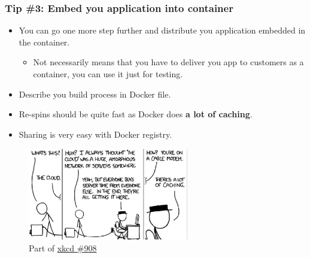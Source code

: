 \documentclass[10pt,utf8]{beamer}
\begin{document}
\begin{frame}
	\frametitle{Tip \#3: Embed you application into container}
	\begin{itemize}
		\item You can go one more step further and distribute you application embedded in the container.
		\begin{itemize}
			\item Not necessarily means that you have to deliver you app to customers as a container, you can use it just for testing.
		\end{itemize}
		\item Describe you build process in Docker file.
		\item Re-spins should be quite fast as Docker does \textbf{a lot of caching}.
		\item Sharing is very easy with Docker registry.
	\end{itemize}
	\begin{figure}
		\centering
		\includegraphics[width=7cm]{./img/xkcd_908.eps}
		\caption{\tiny{Part of \href{http://xkcd.com/908/}{xkcd \#908}}}
	\end{figure}
\end{frame}
\end{document}
